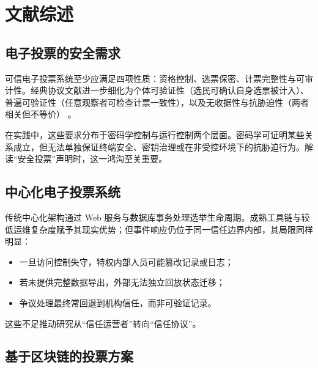 ﻿\chapter{文献综述}
\begingroup
\justifying
\setlength{\parindent}{0pt}
\setlength{\parskip}{0.5\baselineskip}
\titlespacing{\chapter}{0pt}{0pt}{0pt}
\titlespacing{\section}{0pt}{0pt}{0pt}

\section{电子投票的安全需求}

可信电子投票系统至少应满足四项性质：资格控制、选票保密、计票完整性与可审计性。经典协议文献进一步细化为个体可验证性（选民可确认自身选票被计入）、普遍可验证性（任意观察者可检查计票一致性），以及无收据性与抗胁迫性（两者相关但不等价） \cite{benaloh1994,chaum2004,juels2005}。

在实践中，这些要求分布于密码学控制与运行控制两个层面。密码学可证明某些关系成立，但无法单独保证终端安全、密钥治理或在非受控环境下的抗胁迫行为。解读“安全投票”声明时，这一鸿沟至关重要。

\section{中心化电子投票系统}

传统中心化架构通过 Web 服务与数据库事务处理选举生命周期。成熟工具链与较低运维复杂度赋予其现实优势；但事件响应仍位于同一信任边界内部，其局限同样明显：
\begin{itemize}
    \item 一旦访问控制失守，特权内部人员可能篡改记录或日志；
    \item 若未提供完整数据导出，外部无法独立回放状态迁移；
    \item 争议处理最终常回退到机构信任，而非可验证记录。
\end{itemize}

这些不足推动研究从“信任运营者”转向“信任协议”。

\section{基于区块链的投票方案}


